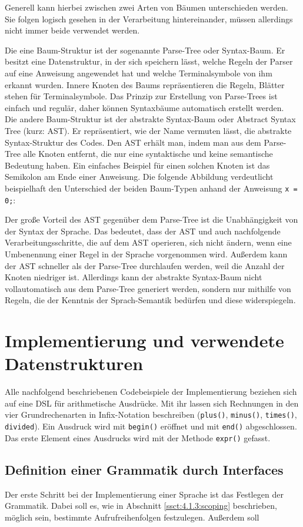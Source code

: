 Generell kann hierbei zwischen zwei Arten von Bäumen unterschieden werden. Sie folgen logisch gesehen in der Verarbeitung hintereinander, müssen allerdings nicht immer beide verwendet werden.

Die eine Baum-Struktur ist der sogenannte Parse-Tree oder Syntax-Baum. Er besitzt eine Datenstruktur, in der sich speichern lässt, welche Regeln der Parser auf eine Anweisung angewendet hat und welche Terminalsymbole von ihm erkannt wurden. Innere Knoten des Baums repräsentieren die Regeln, Blätter stehen für Terminalsymbole. Das Prinzip zur Erstellung von Parse-Trees ist einfach und regulär, daher können Syntaxbäume automatisch erstellt werden.\\
Die andere Baum-Struktur ist der abstrakte Syntax-Baum oder Abstract Syntax Tree (kurz: AST). Er repräsentiert, wie der Name vermuten lässt, die abstrakte Syntax-Struktur des Codes. Den AST erhält man, indem man aus dem Parse-Tree alle Knoten entfernt, die nur eine syntaktische und keine semantische Bedeutung haben. Ein einfaches Beispiel für einen solchen Knoten ist das Semikolon am Ende einer Anweisung. Die folgende Abbildung verdeutlicht beispielhaft den Unterschied der beiden Baum-Typen anhand der Anweisung \texttt{x = 0;}:

Der große Vorteil des AST gegenüber dem Parse-Tree ist die Unabhängigkeit von der Syntax der Sprache. Das bedeutet, dass der AST und auch  nachfolgende Verarbeitungsschritte, die auf dem AST operieren, sich nicht ändern, wenn eine Umbenennung einer Regel in der Sprache vorgenommen wird. Außerdem kann der AST schneller als der Parse-Tree durchlaufen werden, weil die Anzahl der Knoten niedriger ist. Allerdings kann der abstrakte Syntax-Baum nicht vollautomatisch aus dem Parse-Tree generiert werden, sondern nur mithilfe von Regeln, die der Kenntnis der Sprach-Semantik bedürfen und diese widerspiegeln.


\section{Implementierung und verwendete Datenstrukturen}\label{ssct:4.3:implementierung}
Alle nachfolgend beschriebenen Codebeispiele der Implementierung beziehen sich auf eine DSL für arithmetische Ausdrücke. Mit ihr lassen sich Rechnungen in den vier Grundrechenarten in Infix-Notation beschreiben (\texttt{plus()}, \texttt{minus()}, \texttt{times()}, \texttt{divided}). Ein Ausdruck wird mit \texttt{begin()} eröffnet und mit \texttt{end()} abgeschlossen. Das erste Element eines Ausdrucks wird mit der Methode \texttt{expr()} gefasst.

\subsection{Definition einer Grammatik durch Interfaces}\label{ssct:4.3.1:grammatik}
Der erste Schritt bei der Implementierung einer Sprache ist das Festlegen der Grammatik. Dabei soll es, wie in Abschnitt \ref{ssct:4.1.3:scoping} beschrieben, möglich sein, bestimmte Aufrufreihenfolgen festzulegen. Außerdem soll